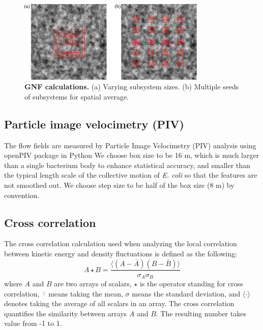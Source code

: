 \documentclass[preprint,aps,prl,amsmath,amssymb,longbibliography]{revtex4-2}
\begin{document}
\begin{figure}[!]
\begin{center}
\includegraphics[width=0.8\textwidth]{figures/GNF-calculation/v1.pdf}
\caption[Concentration dependence of GNF.]
{
\textbf{GNF calculations.}
(a) Varying subsystem sizes.
(b) Multiple seeds of subsystems for spatial average.
}
\label{GNF-calculation}
\end{center}
\end{figure}


\subsection{Particle image velocimetry (PIV)}

The flow fields are measured by Particle Image Velocimetry (PIV) analysis using openPIV package in Python %
We choose box size to be 16 \textmu m, which is much larger than a single bacterium body to enhance statistical accuracy, and smaller than the typical length scale of the collective motion of \textit{E. coli} so that the features are not smoothed out. We choose step size to be half of the box size (8 \textmu m) by convention.

\subsection{Cross correlation}

The cross correlation calculation used when analyzing the local correlation between kinetic energy and density fluctuations is defined as the following:
\begin{equation}
\label{eq:cross-correlation}
A\star B = \frac{\langle(A-\bar A)(B-\bar B)\rangle}{\sigma_A\sigma_B}
\end{equation}
where $A$ and $B$ are two arrays of scalars, $\star$ is the operator standing for cross correlation, $\bar\cdot$ means taking the mean, $\sigma$ means the standard deviation, and $\langle\cdot\rangle$ denotes taking the average of all scalars in an array. The cross correlation quantifies the similarity between arrays $A$ and $B$. The resulting number takes value from -1 to 1.
\end{document}
